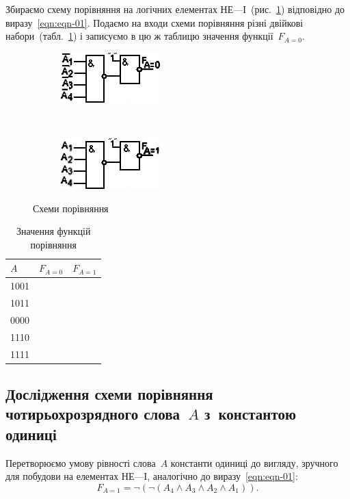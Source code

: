 \documentclass[a4paper,oneside,DIV=12,12pt,headings=normal]{scrartcl}
\begin{document}
			Збираємо схему порівняння на логічних елементах НЕ—І~(рис.~\ref{subfig:comparator-schematics-01-01}) відповідно до виразу~\eqref{eqn:eqn-01}. Подаємо на входи схеми порівняння різні двійкові набори~(табл.~\ref{tab:comparator-datasets-01}) і записуємо в цю ж таблицю значення функції~$F_{A = 0}$.
			
			\begin{figure}[!htbp]
			\centering
				\begin{subfigure}[c]{0.5\linewidth - 1em}
				\centering
					\includegraphics[height = 4\baselineskip]{./assets/01-01.png}
				\caption{}
				\label{subfig:comparator-schematics-01-01}
				\end{subfigure}
				~
				\begin{subfigure}[c]{0.5\linewidth - 1em}
				\centering
					\includegraphics[height = 4\baselineskip]{./assets/01-02.png}
				\caption{}
				\label{subfig:comparator-schematics-01-02}
				\end{subfigure}
			\caption{Схеми порівняння}
			\label{fig:comparator-schematics}
			\end{figure}
			
			
			
			\begin{table}[!htbp]
			\centering
				\begin{tabular}{lrr}
					\toprule
						$A$ & $F_{A = 0}$ & $F_{A = 1}$\\
					\midrule
						1001 & & \\
						1011 & & \\
						0000 & & \\
						1110 & & \\
						1111 & & \\
					\bottomrule
				\end{tabular}
			\caption{Значення функцій порівняння}
			\label{tab:comparator-datasets-01}
			\end{table}
			
		\subsection{Дослідження схеми порівняння чотирьохрозрядного слова~$A$ з~константою одиниці}
			Перетворюємо умову рівності слова~$A$ константи одиниці до вигляду, зручного для побудови на елементах НЕ—І, аналогічно до виразу~\eqref{eqn:eqn-01}:
			\begin{equation}
			\label{eqn:eqn-02}
				F_{A = 1} = \neg \left( \neg \left( A_4 \land A_3 \land A_2 \land A_1 \right) \right).
			\end{equation}
			
\end{document}
